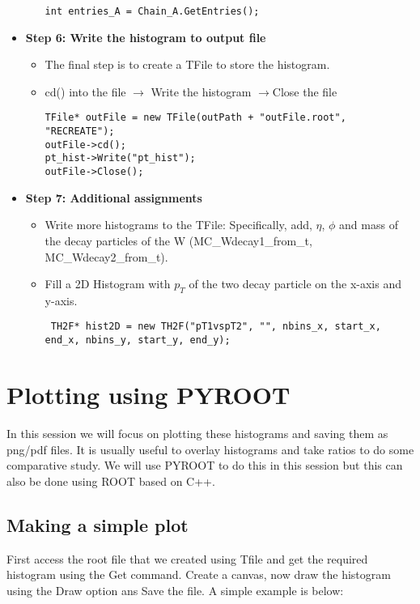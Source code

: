 \documentclass[letterpaper,12pt]{article}
\begin{document}
\begin{itemize}
\begin{itemize}
\begin{lstlisting}
int entries_A = Chain_A.GetEntries();
\end{lstlisting}
\end{itemize}
\item {\bf Step 6: Write the histogram to output file}
\begin{itemize}
	\item The final step is to create a TFile to store the histogram. 
\item cd() into the file $\rightarrow$ Write the histogram $\rightarrow$Close the file

\begin{lstlisting}     
TFile* outFile = new TFile(outPath + "outFile.root", "RECREATE");
outFile->cd();             
pt_hist->Write("pt_hist");
outFile->Close();                                                    
         \end{lstlisting}
\end{itemize}

\item{\bf Step 7: Additional assignments}
\begin{itemize}
	\item Write more histograms to the TFile: Specifically, add, $\eta$, $\phi$ and mass of the decay particles of the W (MC\_Wdecay1\_from\_t, MC\_Wdecay2\_from\_t).
	\item Fill a 2D Histogram with $p_{T}$ of the two decay particle on the x-axis and y-axis.
	\begin{lstlisting}
 TH2F* hist2D = new TH2F("pT1vspT2", "", nbins_x, start_x, end_x, nbins_y, start_y, end_y);
\end{lstlisting}


\end{itemize}
\end{itemize}
\break
\section{Plotting using PYROOT}

In this session we will focus on plotting these histograms and saving them as png/pdf files. It is usually useful to overlay histograms and take ratios to do some comparative study. We will use PYROOT to do this in this session but this can also be done using ROOT based on C++. 

\subsection{Making a simple plot}
First access the root file that we created using Tfile and get the required histogram using the Get command. Create a canvas, now draw the histogram using the Draw option ans Save the file. A simple example is below:
\end{document}
